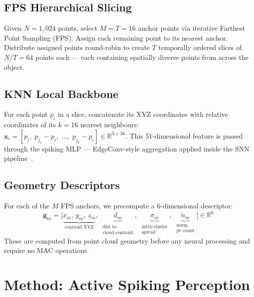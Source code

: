 \documentclass[11pt,a4paper]{article}
\begin{document}
\subsection{FPS Hierarchical Slicing}

Given $N{=}1{,}024$ points, select $M{=}T{=}16$ anchor points via iterative
Farthest Point Sampling (FPS). Assign each remaining point to its nearest
anchor. Distribute assigned points round-robin to create $T$ temporally ordered
slices of $N/T{=}64$ points each --- each containing spatially diverse points
from across the object.

\subsection{KNN Local Backbone}

For each point $p_i$ in a slice, concatenate its XYZ coordinates with relative
coordinates of its $k{=}16$ nearest neighbours:
$\mathbf{x}_i = [p_i,\; p_{j_1}{-}p_i,\;\ldots,\; p_{j_k}{-}p_i] \in
\mathbb{R}^{3+3k}$.
This 51-dimensional feature is passed through the spiking MLP --- EdgeConv-style
aggregation applied inside the SNN pipeline~\cite{dgcnn}.

\subsection{Geometry Descriptors}

For each of the $M$ FPS anchors, we precompute a 6-dimensional descriptor:
\begin{equation}
  \mathbf{g}_m = \bigl[\underbrace{x_m,\, y_m,\, z_m}_{\text{centroid XYZ}},\;
                       \underbrace{d_m}_{\substack{\text{dist to}\\\text{cloud centroid}}},\;
                       \underbrace{\sigma_m}_{\substack{\text{intra-cluster}\\\text{spread}}},\;
                       \underbrace{\tilde{n}_m}_{\substack{\text{norm.}\\\text{pt count}}}\bigr]
  \in \mathbb{R}^6
  \label{eq:geo}
\end{equation}
These are computed from point cloud geometry before any neural processing and
require no MAC operations.

\section{Method: Active Spiking Perception}
\end{document}
